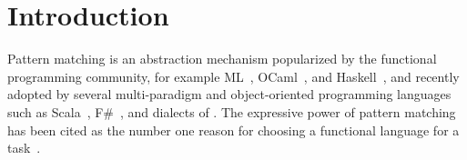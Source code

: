 \section{Introduction} %
\label{sec:intro}


Pattern matching is an abstraction mechanism popularized by the functional
programming community, for example ML~\cite{ML78},
OCaml~\cite{OPM01}, and Haskell~\cite{haskell90},
and recently adopted by several multi-paradigm and object-oriented programming 
languages such as Scala~\cite{Scala2nd}, F\#~\cite{Syme07}, 
 and dialects of 
\Cpp{}\cite{Prop96,App}.
The expressive power of pattern matching has been cited as the number one reason for choosing a functional language for a 
task~\cite{FramaC09,Minsky08,Nanavati08}.

